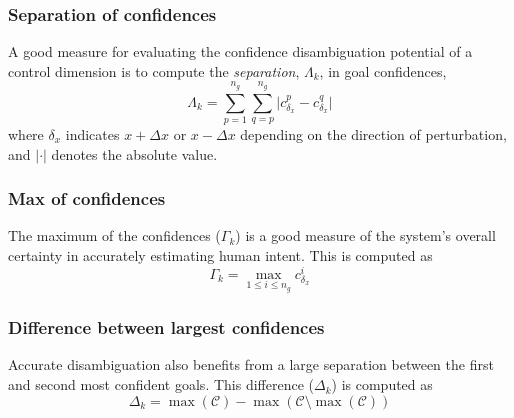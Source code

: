 \documentclass[conference]{IEEEtran}
\newcommand{\argmax}{\arg\!\max}
\begin{document}
\subsubsection{Separation of confidences}
A good measure for evaluating the confidence disambiguation potential of a control dimension is to compute the \textit{separation}, $\Lambda_{k}$, in goal confidences,
\begin{equation*}
\Lambda_{k} = \sum_{p=1}^{n_g}\sum_{q=p}^{n_g}\lvert c^{p}_{\delta_x} - c^{q}_{\delta_x}\rvert
\end{equation*}
where $\delta_x$ indicates $x+\Delta x$ or $x-\Delta x$ depending on the direction of perturbation, and $\lvert\cdot\rvert$ denotes the absolute value. 
\subsubsection{Max of confidences}
The maximum of the confidences ($\Gamma_{k}$) is a good measure of the system's overall certainty in accurately estimating human intent. 
This is computed as
\begin{equation*}
\Gamma_{k} =\max\limits_{1 \leq i \leq n_g}c^{i}_{\delta_x}
\end{equation*}
\subsubsection{Difference between largest confidences}
%
Accurate disambiguation also benefits from a large separation between the first and second most confident goals. 
This difference ($\Delta_{k}$) is computed as
\begin{equation*}
\Delta_{k} = \max(\mathcal{C}) - \max(\mathcal{C} \setminus {\max(\mathcal{C})})
\end{equation*}
\end{document}
